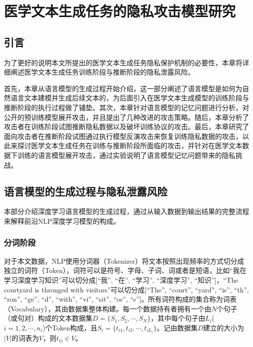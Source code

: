 
\chapter{医学文本生成任务的隐私攻击模型研究}

\section{引言}

为了更好的说明本文所提出的医学文本生成任务隐私保护机制的必要性，本章将详细阐述医学文本生成任务训练阶段与推断阶段的隐私泄露风险。

首先，本章从语言模型的生成过程开始介绍，这一部分阐述了语言模型是如何为自然语言文本建模并生成后续文本的，为后面引入在医学文本生成模型的训练阶段与推断阶段的执行过程做了铺垫。其次，本章针对语言模型的记忆问题进行分析，对公开的预训练模型展开攻击，并且提出了几种改进的攻击策略。随后，本章分析了攻击者在训练阶段试图推断隐私数据以及破坏训练协议的攻击。最后，本章研究了面向攻击者在推断阶段试图通过执行模型反演攻击来恢复训练隐私数据的攻击，以此来探讨医学文本生成任务在训练与推断阶段所面临的攻击，并针对在医学文本数据下训练的语言模型展开攻击，通过实验说明了语言模型记忆问题带来的隐私挑战。

\section{语言模型的生成过程与隐私泄露风险}

本部分介绍深度学习语言模型的生成过程，通过从输入数据到输出结果的完整流程来解释前沿NLP深度学习模型的构成。

\subsection{分词阶段}

对于本文数据，NLP使用分词器（Tokenizer）将文本按照出现频率的方式切分成独立的词符（Token），词符可以是符号、字母、子词、词或者是短语，比如“我在学习深度学习知识”可以切分成[“我”, “在”, “学习”, “深度学习”, “知识”]，“The courtyard is thronged with visitors”可以切分成[“The”, “court”, “yard”, “is”, “th”, “ron”, “ge”, “d”, “with”, “vi”, “sit”, “or”, “s”]。所有词符构成的集合称为词表（Vocabulary），其由数据集整体构建。每一个数据持有者拥有一个由$N$个句子（或句对）构成的文本数据集$D=\{S_1,S_2,\cdots,S_N\}$，其中每个句子由$L_i$($i=1,2,\cdots,n_{i}$)个Token构成，且$S_i=\{t_{i1}, t_{i2}, \cdots,t_{iL_i}\}$。记由数据集$D$建立的大小为$|V|$的词表为$V$，则$t_{ij}\in V$。

